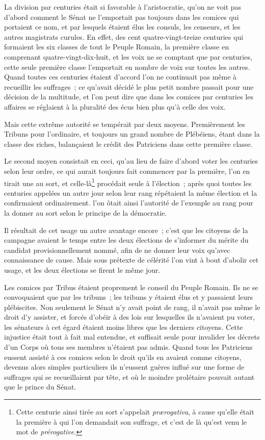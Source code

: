 \documentclass[french,twoside]{book} %
\begin{document}
La division par centuries était si favorable à l’aristocratie, qu’on ne voit pas d’abord comment le Sénat ne l’emportait pas toujours dans les comices qui portaient ce nom, et par lesquels étaient élus les consuls, les censeurs, et les autres magistrats curules. En effet, des cent quatre-vingt-treize centuries qui formaient les six classes de tout le Peuple Romain, la première classe en comprenant quatre-vingt-dix-huit, et les voix ne se comptant que par centuries, cette seule première classe l’emportait en nombre de voix sur toutes les autres. Quand toutes ces centuries étaient d’accord l’on ne continuait pas même à recueillir les suffrages ; ce qu’avait décidé le plus petit nombre passait pour une décision de la multitude, et l’on peut dire que dans les comices par centuries les affaires se réglaient à la pluralité des écus bien plus qu’à celle des voix.\par
Mais cette extrême autorité se tempérait par deux moyens. Premièrement les Tribuns pour l’ordinaire, et toujours un grand nombre de Plébéiens, étant dans la classe des riches, balançaient le crédit des Patriciens dans cette première classe.\par
Le second moyen consistait en ceci, qu’au lieu de faire d’abord voter les centuries selon leur ordre, ce qui aurait toujours fait commencer par la première, l’on en tirait une au sort, et celle-là\footnote{Cette centurie ainsi tirée au sort s’appelait {\itshape prærogativa}, à cause qu’elle était la première à qui l’on demandait son suffrage, et c’est de là qu’est venu le mot de {\itshape prérogative.}} procédait seule à l’élection ; après quoi toutes les centuries appelées un autre jour selon leur rang répétaient la même élection et la confirmaient ordinairement. l’on ôtait ainsi l’autorité de l’exemple au rang pour la donner au sort selon le principe de la démocratie.\par
Il résultait de cet usage un autre avantage encore ; c’est que les citoyens de la campagne avaient le temps entre les deux élections de s’informer du mérite du candidat provisionnellement nommé, afin de ne donner leur voix qu’avec connaissance de cause. Mais sous prétexte de célérité l’on vint à bout d’abolir cet usage, et les deux élections se firent le même jour.\par
Les comices par Tribus étaient proprement le conseil du Peuple Romain. Ils ne se convoquaient que par les tribuns ; les tribuns y étaient élus et y passaient leurs plébiscites. Non seulement le Sénat n’y avait point de rang, il n’avait pas même le droit d’y assister, et forcés d’obéir à des lois sur lesquelles ils n’avaient pu voter, les sénateurs à cet égard étaient moins libres que les derniers citoyens. Cette injustice était tout à fait mal entendue, et suffisait seule pour invalider les décrets d’un Corps où tous ses membres n’étaient pas admis. Quand tous les Patriciens eussent assisté à ces comices selon le droit qu’ils en avaient comme citoyens, devenus alors simples particuliers ils n’eussent guères influé sur une forme de suffrages qui se recueillaient par tête, et où le moindre prolétaire pouvait autant que le prince du Sénat.\par
\end{document}
